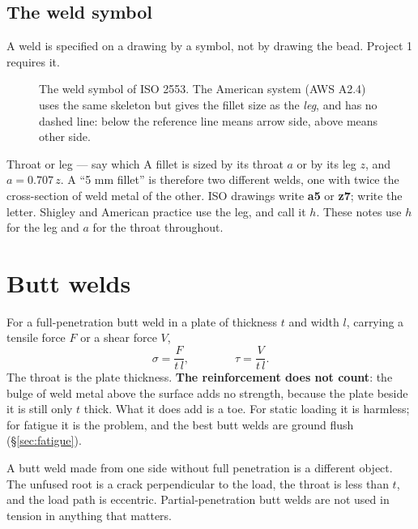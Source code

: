 \documentclass[11pt,a4paper]{article}
\begin{document}
\subsection*{The weld symbol}

A weld is specified on a drawing by a symbol, not by drawing the bead. Project 1 requires it.

\begin{figure}[H]\centering
\resizebox{0.92\textwidth}{!}{}
\caption{The weld symbol of ISO 2553. The American system (AWS A2.4) uses the same skeleton but
gives the fillet size as the \emph{leg}, and has no dashed line: below the reference line means
arrow side, above means other side.}
\label{fig:symbol}
\end{figure}

\begin{keybox}{Throat or leg --- say which}
A fillet is sized by its throat $a$ or by its leg $z$, and $a=0.707\,z$. A ``5 mm fillet'' is
therefore two different welds, one with twice the cross-section of weld metal of the other. ISO
drawings write \textbf{a5} or \textbf{z7}; write the letter. Shigley and American practice use the
leg, and call it $h$. These notes use $h$ for the leg and $a$ for the throat throughout.
\end{keybox}

\section{Butt welds}

For a full-penetration butt weld in a plate of thickness $t$ and width $l$, carrying a tensile
force $F$ or a shear force $V$,
\begin{equation}
\sigma=\frac{F}{t\,l},\qquad\qquad \tau=\frac{V}{t\,l}.
\end{equation}
The throat is the plate thickness. \textbf{The reinforcement does not count}: the bulge of weld
metal above the surface adds no strength, because the plate beside it is still only $t$ thick. What
it does add is a toe. For static loading it is harmless; for fatigue it is the problem, and the
best butt welds are ground flush (\S\ref{sec:fatigue}).

\medskip
A butt weld made from one side without full penetration is a different object. The unfused root is
a crack perpendicular to the load, the throat is less than $t$, and the load path is eccentric.
Partial-penetration butt welds are not used in tension in anything that matters.
\end{document}
